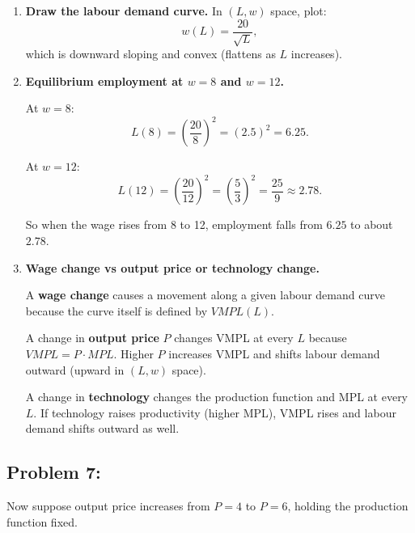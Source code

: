 \documentclass[12pt]{article}
\begin{document}
\begin{enumerate}
\item \textbf{Draw the labour demand curve.}
In $(L,w)$ space, plot:
\[
w(L)=\frac{20}{\sqrt{L}},
\]
which is downward sloping and convex (flattens as $L$ increases).

\item \textbf{Equilibrium employment at $w=8$ and $w=12$.}

At $w=8$:
\[
L(8)=\left(\frac{20}{8}\right)^2 = (2.5)^2 = 6.25.
\]

At $w=12$:
\[
L(12)=\left(\frac{20}{12}\right)^2 = \left(\frac{5}{3}\right)^2 = \frac{25}{9} \approx 2.78.
\]

So when the wage rises from 8 to 12, employment falls from $6.25$ to about $2.78$.

\item \textbf{Wage change vs output price or technology change.}

A \textbf{wage change} causes a movement along a given labour demand curve because the curve itself is defined by $VMPL(L)$.

A change in \textbf{output price} $P$ changes VMPL at every $L$ because $VMPL=P\cdot MPL$. Higher $P$ increases VMPL and shifts labour demand outward (upward in $(L,w)$ space).

A change in \textbf{technology} changes the production function and MPL at every $L$. If technology raises productivity (higher MPL), VMPL rises and labour demand shifts outward as well.
\end{enumerate}

\subsection*{Problem 7: }

Now suppose output price increases from $P=4$ to $P=6$, holding the production function fixed.
\end{document}
